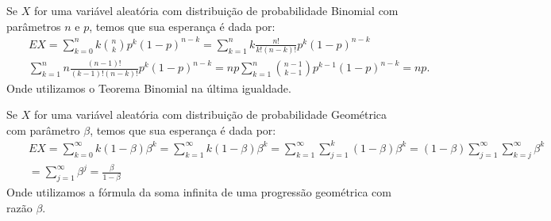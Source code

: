 \begin{frame}
\begin{exem}[Binomial]
%
Se $X$ for uma variável aleatória
com distribuição de probabilidade Binomial com parâmetros $n$ e $p$,
temos que sua esperança é dada por:
\begin{eqnarray}
& & EX=\sum_{k=0}^{n}
k\binom{n}{k}p^k(1-p)^{n-k}= 
 \sum_{k=1}^{n}k\frac{n!}{k!(n-k)!}p^k(1-p)^{n-k}
\nonumber\\
& &
\sum_{k=1}^{n}n\frac{(n-1)!}{(k-1)!(n-k)!}p^k(1-p)^{n-k} =np\sum_{k=1}^{n}\binom{n-1}{k-1}p^{k-1}(1-p)^{n-k}=np.
\nonumber
\end{eqnarray}
Onde utilizamos o Teorema Binomial na última igualdade.
\end{exem}
\begin{exem}[Geométrica]
%
Se $X$ for uma variável aleatória
com distribuição de probabilidade Geométrica com parâmetro $\beta$,
temos que sua esperança é dada por:
\begin{eqnarray}
& &
EX=\sum_{k=0}^{\infty}k(1-\beta)\beta^{k}=\sum_{k=1}^{\infty}k(1-\beta)\beta^{k}
=\sum_{k=1}^{\infty}\sum_{j=1}^{k}(1-\beta)\beta^{k}
=(1-\beta)\sum_{j=1}^{\infty}\sum_{k=j}^{\infty}\beta^{k}\nonumber \\
& & =\sum_{j=1}^{\infty}\beta^j=\frac{\beta}{1-\beta}
\nonumber
\end{eqnarray}
Onde utilizamos a fórmula da soma infinita de uma progressão
geométrica com razão $\beta$.
\end{exem}
\end{frame}
%
